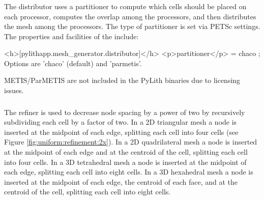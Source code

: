 
\subsubsection{}

The distributor uses a partitioner to compute which cells should be
placed on each processor, computes the overlap among the processors,
and then distributes the mesh among the processors. The type of
partitioner is set via PETSc settings. The properties and facilities
of the  include:
\begin{inventory}
\end{inventory}
\begin{cfg}
<h>[pylithapp.mesh_generator.distributor]</h>
<p>partitioner</p> = chaco ; Options are 'chaco' (default) and 'parmetis'.
\end{cfg}
METIS/ParMETIS are not included in the PyLith binaries due to licensing
issues. 


\subsubsection{}

The refiner is used to decrease node spacing by a power of two by
recursively subdividing each cell by a factor of two. In a 2D triangular
mesh a node is inserted at the midpoint of each edge, splitting each
cell into four cells (see Figure \vref{fig:uniform:refinement:2x}).
In a 2D quadrilateral mesh a node is inserted at the midpoint of each
edge and at the centroid of the cell, splitting each cell into four
cells. In a 3D tetrahedral mesh a node is inserted at the midpoint
of each edge, splitting each cell into eight cells. In a 3D hexahedral
mesh a node is inserted at the midpoint of each edge, the centroid
of each face, and at the centroid of the cell, splitting each cell
into eight cells.

